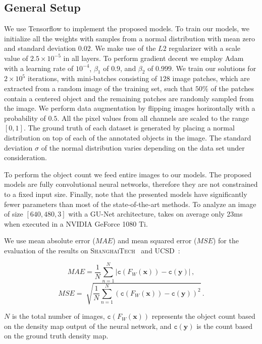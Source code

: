 \documentclass{bmvc2k}
\begin{document}
\subsection{General Setup}\label{sec:setup}

We use Tensorflow \cite{tensorflow2015} to implement the proposed models. To train our models, we initialize all the weights with samples from a normal distribution with mean zero and standard deviation $0.02$. We make use of the $L2$ regularizer with a scale value of $2.5 \times 10^{-5}$ in all layers. To perform gradient decent we employ Adam \cite{adamKingmaICLR2015} with a learning rate of $10^{-4}$, $\beta_1$ of $0.9$, and $\beta_2$ of $0.999$. We train our solutions for $2 \times 10^5$ iterations, with mini-batches consisting of $128$ image patches, which are extracted from a random image of the training set, such that $50\%$ of the patches contain a centered object and the remaining patches are randomly sampled from the image. We perform data augmentation by flipping images horizontally with a probability of $0.5$.  All the pixel values from all channels are scaled to the range $[0,1]$. The ground truth of each dataset is generated by placing a normal distribution on top of each of the annotated objects in the image. The standard deviation $\sigma$ of the normal distribution varies depending on the data set under consideration. 

To perform the object count we feed entire images to our models. The proposed models are fully convolutional neural networks, therefore they are not constrained to a fixed input size. Finally, note that the presented models have significantly fewer parameters than most of the state-of-the-art methods. To analyze an image of size $[640,480,3]$ with a GU-Net architecture, takes on average only 23ms when executed in a NVIDIA GeForce 1080 Ti.

We use mean absolute error ($MAE$) and mean squared error ($MSE$) for the evaluation of the results on \textsc{ShanghaiTech}~\cite{zhang2016} and \textsc{UCSD}~\cite{chan2008}: \vspace{-0.9cm}\begin{multicols}{2}
  \begin{equation}
    MAE = \frac{1}{N} \sum^{N}_{n=1} \left| \mathtt{c}(F_W(\boldsymbol{x})) - \mathtt{c}(\boldsymbol{y})  \right|\, ,
  \end{equation}
  \begin{equation}
    MSE = \sqrt[]{\frac{1}{N} \sum^{N}_{n=1} {\left( \mathtt{c}(F_W(\boldsymbol{x})) - \mathtt{c}(\boldsymbol{y})  \right)}^2}\, .
  \end{equation}
\end{multicols}$N$ is the total number of images, $\mathtt{c}(F_W(\boldsymbol{x}))$ represents the object count based on the density map output of the neural network, and $\mathtt{c}(\boldsymbol{y})$ is the count based on the ground truth density map. 
\end{document}

